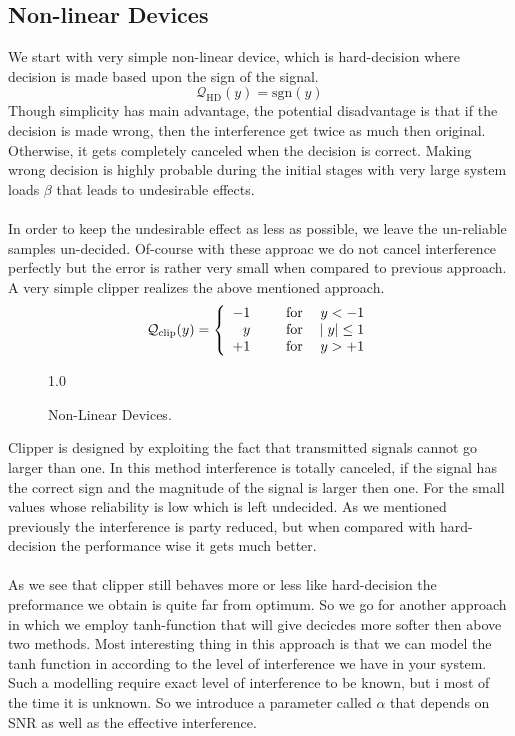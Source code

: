 \subsection{Non-linear Devices}
We start with very simple non-linear device, which is hard-decision where decision is made based upon the sign of the signal.
\begin{equation}
\mathcal{Q}_{\mathrm{HD}}(y)=\mathrm{sgn}(y)
\end{equation}
Though simplicity has main advantage, the potential disadvantage is that if the decision is made wrong, then the interference get twice as much then original. Otherwise, it gets completely canceled when the decision is correct. Making wrong decision is highly probable during the initial stages with very large system loads $\beta$ that leads to undesirable effects. \\ \\
In order to keep the undesirable effect as less as possible, we leave the un-reliable samples un-decided. Of-course with these approac we do not cancel interference perfectly but the error is rather very small when compared to previous approach. A very simple clipper realizes the above mentioned approach.
\begin{eqnarray}
\mathcal{Q}_{\mathrm{clip}}(y)=\left\{
\begin{array}{rllr}
-1&\hspace{2mm}&\mathrm{for}&\;y < -1 \\ 
 y&\hspace{2mm}&\mathrm{for}&\vert\; y \vert \leq 1 \\ 
+1&\hspace{2mm}&\mathrm{for}&\;y > +1
\end{array}
\right.
\end{eqnarray}
\begin{figure}[htb]
\centerline{  {1.0} }
\caption{Non-Linear Devices.}
\end{figure}
Clipper is designed by exploiting the fact that transmitted signals cannot go larger than one. In this method interference is totally canceled, if the signal has the correct sign and the magnitude of the signal is larger then one. For the small values whose reliability is low which is left undecided. As we mentioned previously the interference is party reduced, but when compared with hard-decision the performance wise it gets much better.\\ \\
As we see that clipper still behaves more or less like hard-decision the preformance we obtain is quite far from optimum. So we go for another approach in which we employ tanh-function that will give decicdes more softer then above two methods. Most interesting thing in this approach is that we can model the tanh function in according to the level of interference we have in your system. Such a modelling require exact level of interference to be known, but i most of the time it is unknown. So we introduce a parameter called $\alpha$ that depends on SNR as well as the effective interference.
